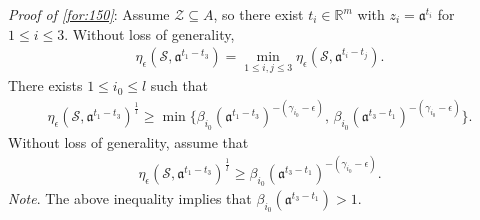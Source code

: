 \documentclass[11 pt]{amsart}
\theoremstyle{definition}
\numberwithin{equation}{section}
\begin{document}
\emph{Proof of \eqref{for:150}}: Assume $\mathcal{Z}\subseteq A$, so there exist $t_i\in\mathbb{R}^m$ with $z_i=\mathfrak{a}^{t_i}$ for $1\le i\le3$. Without loss of generality,
\begin{align*}
\eta_\epsilon (\mathcal{S}, \mathfrak{a}^{t_1-t_3})=\min_{1\le i,j\le 3}\eta_\epsilon (\mathcal{S}, \mathfrak{a}^{t_i-t_j}).
\end{align*}
There exists $1\leq i_0\leq l$ such that
\begin{align*}
 \eta_{\epsilon} (\mathcal{S}, \mathfrak{a}^{t_1-t_{3}})^{\frac{1}{l}}\geq \min\{\beta_{i_0}(\mathfrak{a}^{t_{1}-t_{3}})^{-(\gamma_{i_0}-\epsilon)},\,\beta_{i_0}(\mathfrak{a}^{t_{3}-t_{1}})^{-(\gamma_{i_0}-\epsilon)}\}.
\end{align*}
Without loss of generality, assume that
\begin{align}\label{for:147}
\eta_{\epsilon} (\mathcal{S}, \mathfrak{a}^{t_1-t_{3}})^{\frac{1}{l}}\geq \beta_{i_0}(\mathfrak{a}^{t_{3}-t_{1}})^{-(\gamma_{i_0}-\epsilon)}.
\end{align}
\emph{Note}. The above inequality implies that $\beta_{i_0}(\mathfrak{a}^{t_{3}-t_{1}})>1$.
\end{document}
